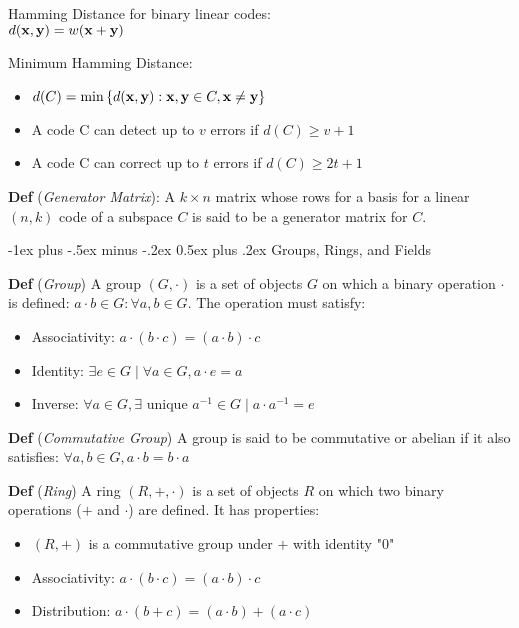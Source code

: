 \documentclass[12pt,landscape]{article}
\makeatletter
\renewcommand{\section}{\@startsection{section}{1}{0mm}%
                                {-1ex plus -.5ex minus -.2ex}%
                                {0.5ex plus .2ex}%
                                {\normalfont\normalsize\bfseries}}
\newcommand{\tab}{\hspace{.02\textwidth}}
\newcommand{\defn}[1]{\textbf{Def} (\emph{#1})}
\newcommand{\set}[1]{\left\{ #1 \right\}}
\makeatother
\begin{document}
\begin{multicols}{3}
Hamming Distance for binary linear codes:\\
\tab $d(\vb{x}, \vb{y}) = w(\vb{x} + \vb{y})$

Minimum Hamming Distance:\\
\begin{itemize}
    \item $d(C) = \min{\set{d(\vb{x}, \vb{y}) : \vb{x}, \vb{y} \in C, \vb{x} \neq \vb{y}}}$
    \item A code C can detect up to $v$ errors if $d(C) \geq v + 1$
    \item A code C can correct up to $t$ errors if $d(C) \geq 2t + 1$
\end{itemize}

\defn{Generator Matrix}: A $k\times n$ matrix whose rows for a basis for a linear $(n,k)$ code of a subspace $C$ is said to be a generator matrix for $C$.

\section{Groups, Rings, and Fields}

\defn{Group} A group $(G, \cdot)$ is a set of objects $G$ on which a binary operation $\cdot$ is defined: $a \cdot b \in G : \forall a,b \in G$. The operation must satisfy:
\begin{itemize}
    \item Associativity: $a \cdot (b \cdot c) = (a \cdot b) \cdot c$
    \item Identity: $\exists e \in G \mid \forall a \in G, a \cdot e = a$
    \item Inverse: $\forall a \in G, \exists \text{ unique } a^{-1} \in G \mid a \cdot a^{-1} = e$
\end{itemize}

\defn{Commutative Group} A group is said to be commutative or abelian if it also satisfies: $\forall a,b \in G, a \cdot b = b \cdot a$

\defn{Ring} A ring $(R, +, \cdot)$ is a set of objects $R$ on which two binary operations ($+$ and $\cdot$) are defined. It has properties:
\begin{itemize}
    \item $(R, +)$ is a commutative group under $+$ with identity "$0$"
    \item Associativity: $a \cdot (b \cdot c) = (a \cdot b) \cdot c$
    \item Distribution: $a \cdot (b + c) = (a \cdot b) + (a \cdot c)$
\end{itemize}


\end{multicols}
\end{document}
